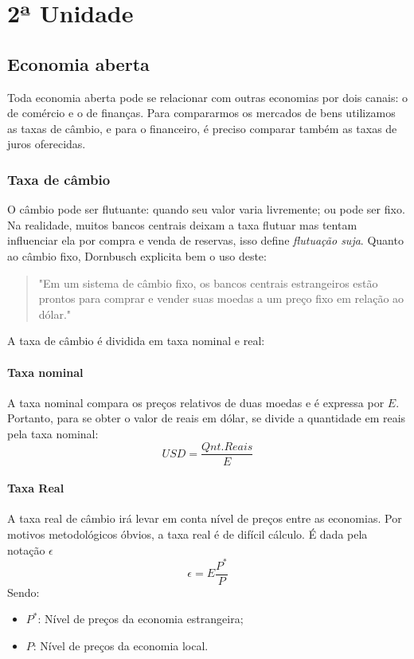 \documentclass[12pt,a4paper,oneside,brazil]{abntex2}
\begin{document}
\chapter{2ª Unidade}
\section{Economia aberta}
Toda economia aberta pode se relacionar com outras economias por dois canais: o de comércio e o de finanças. Para compararmos os mercados de bens utilizamos as taxas de câmbio, e para o financeiro, é preciso comparar também as taxas de juros oferecidas.

\subsection{Taxa de câmbio}
O câmbio pode ser flutuante: quando seu valor varia livremente; ou pode ser fixo. Na realidade, muitos bancos centrais deixam a taxa flutuar mas tentam influenciar ela por compra e venda de reservas, isso define \emph{flutuação suja}. Quanto ao câmbio fixo, Dornbusch explicita bem o uso deste: 
\begin{quotation}
"Em um sistema de câmbio fixo, os bancos centrais estrangeiros estão prontos para
comprar e vender suas moedas a um preço fixo em relação ao dólar." \cite[p.274]{rudiger}
\end{quotation}
A taxa de câmbio é dividida em taxa nominal e real:

\subsubsection{Taxa nominal}
A taxa nominal compara os preços relativos de duas moedas e é expressa por $E$. Portanto, para se obter o valor de reais em dólar, se divide a quantidade em reais pela taxa nominal:
\[ USD = \frac{Qnt. Reais}{E}\]

\subsubsection{Taxa Real}
A taxa real de câmbio irá levar em conta  nível de preços entre as economias. Por motivos metodológicos óbvios, a taxa real é de difícil cálculo. É dada pela notação $\epsilon$
\[ \epsilon = E \frac{P^*}{P}\]
Sendo:
\begin{itemize}
\item $P^*$: Nível de preços da economia estrangeira;
\item $P$: Nível de preços da economia local.
\end{itemize}
\end{document}
